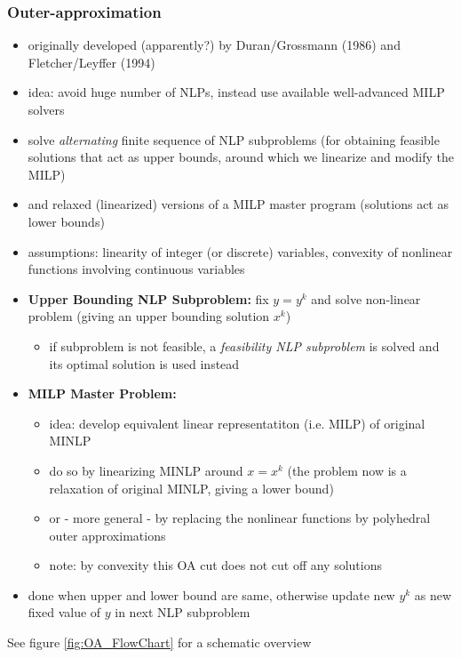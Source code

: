 \documentclass{article}
\begin{document}
\subsubsection{Outer-approximation}
\begin{itemize}
\item originally developed (apparently?) by Duran/Grossmann (1986) and Fletcher/Leyffer (1994)
\item idea: avoid huge number of NLPs, instead use available well-advanced MILP solvers
\item solve \emph{alternating} finite sequence of NLP subproblems (for obtaining feasible solutions that act as upper bounds, around which we linearize and modify the MILP)
\item and relaxed (linearized) versions of a MILP master program (solutions act as lower bounds)
\item assumptions: linearity of integer (or discrete) variables, convexity of nonlinear functions involving continuous variables
\item \textbf{Upper Bounding NLP Subproblem:} fix $y=y^k$ and solve non-linear problem (giving an upper bounding solution $x^k$)
	\begin{itemize}
	\item if subproblem is not feasible, a \emph{feasibility NLP subproblem} is solved and its optimal solution is used instead
	\end{itemize}
\item \textbf{MILP Master Problem:} 
	\begin{itemize}
	\item idea: develop equivalent linear representatiton (i.e. MILP) of original MINLP
	\item do so by linearizing MINLP around $x=x^k$ (the problem now is a relaxation of original MINLP, giving a lower bound)
	\item or - more general - by replacing the nonlinear functions by polyhedral outer approximations
	 \item note: by convexity this OA cut does not cut off any solutions
	\end{itemize}
\item done when upper and lower bound are same, otherwise update new $y^k$ as new fixed value of $y$ in next NLP subproblem
\end{itemize}
See figure \ref{fig:OA_FlowChart} for a schematic overview

\end{document}
